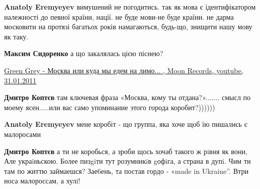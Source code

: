 \begin{itemize}
\begin{itemize}
\begin{itemize}
 
\textbf{Anatoly Eremyeyev} вимушений не погодитись. так як мова є
ідентифікатором належності до певної країни, нації. не буде мови-не буде
країни. не дарма московити на протязі багатьох років намагаються,
будь-що, знищити нашу мову як таку.

\end{itemize}

 
\textbf{Максим Сидоренко} а що закалялась цією піснею?

\href{https://www.youtube.com/watch?v=UsUqEaA0L1o}{%
Green Grey - Москва или куда мы едем на лимо... ,%
Moon Records, youtube, 31.01.2011%
}

\begin{itemize}

 
\textbf{Дмитро Коптєв} там ключевая фраза «Москва, кому ты отдана?»....... смысл по моему ясен.....или вас само упоминание этого города коробит?))))))

 
\textbf{Anatoly Eremyeyev} мене коробіт - що группа, яка хоче щоб їю пишались є малоросами

 
\textbf{Дмитро Коптєв} а ти не коробься, а зроби щось хочаб такого ж рiвня як вони, Але украiньскою. Более пизgiти тут розумникiв gофiга, а страна в дупi. Чим ти там по життю займаешся? Зае6ень, та постав гордо - «made in Ukraine”. Втри носа малороссам, а хулi!


\end{itemize}
\end{itemize}
\end{itemize}
